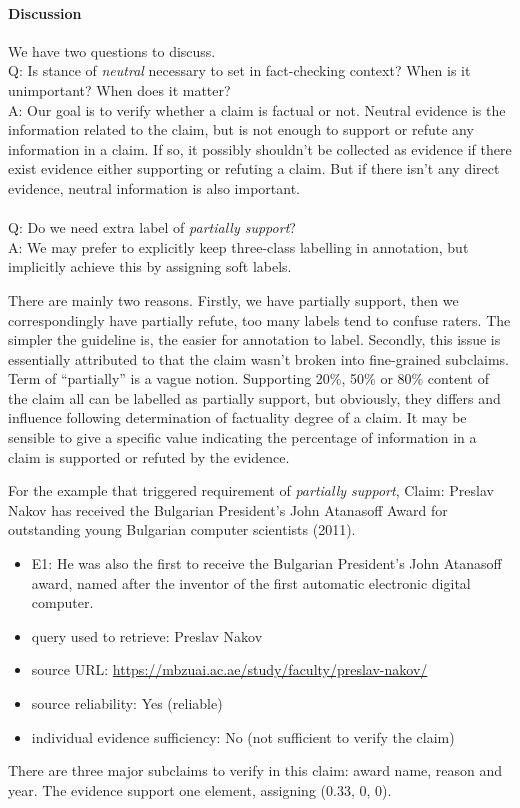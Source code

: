 \documentclass[11pt]{article}
\begin{document}
\paragraph{Discussion} We have two questions to discuss.
\\
Q: Is stance of \textit{neutral} necessary to set in fact-checking context? When is it unimportant? When does it matter? \\
A: Our goal is to verify whether a claim is factual or not.
Neutral evidence is the information related to the claim, but is not enough to support or refute any information in a claim. If so, it possibly shouldn't be collected as evidence if there exist evidence either supporting or refuting a claim.
But if there isn't any direct evidence, neutral information is also important.
\\
\\
Q: Do we need extra label of \textit{partially support}?\\
A: We may prefer to explicitly keep three-class labelling in annotation, but implicitly achieve this by assigning soft labels. 

There are mainly two reasons. 
Firstly, we have partially support, then we correspondingly have partially refute, too many labels tend to confuse raters. 
The simpler the guideline is, the easier for annotation to label.
Secondly, this issue is essentially attributed to that the claim wasn't broken into fine-grained subclaims. 
Term of ``partially'' is a vague notion.
Supporting 20\%, 50\% or 80\% content of the claim all can be labelled as partially support, but obviously, they differs and influence following determination of factuality degree of a claim.
It may be sensible to give a specific value indicating the percentage of information in a claim is supported or refuted by the evidence. 

For the example that triggered requirement of \textit{partially support}, 
Claim: Preslav Nakov has received the Bulgarian President’s John Atanasoff Award for outstanding young Bulgarian computer scientists (2011).
\begin{itemize}
    \item[-] E1: He was also the first to receive the Bulgarian President's John Atanasoff award, named after the inventor of the first automatic electronic digital computer.
    \item[-] query used to retrieve: Preslav Nakov
    \item[-] source URL: \url{https://mbzuai.ac.ae/study/faculty/preslav-nakov/}
    \item[-] source reliability: Yes (reliable)
    \item[-] individual evidence sufficiency: No (not sufficient to verify the claim)  
\end{itemize}
There are three major subclaims to verify in this claim: award name, reason and year.
The evidence support one element, assigning (0.33, 0, 0).
\end{document}
